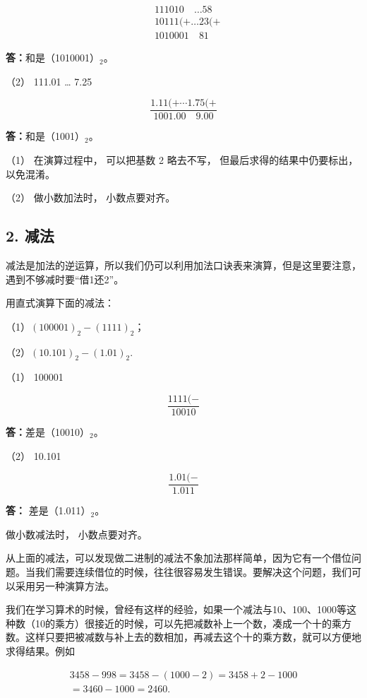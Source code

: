 \[
\begin{array}{rl} & 111010 \quad \dots 58 \\ & 10111 (+ \dots 23 (+ \\ \hline {} & 1010001 \quad 81 \end{array}
\]

\textbf{答：}和是（1010001）\(_{2}\)。

（2） 111.01 \ldots{} 7.25

\[
\frac{1.11 (+ \cdots 1.75 (+}{1001.00 \quad 9.00}
\]

\textbf{答：}和是（1001）\(_{2}\)。

 （1） 在演算过程中， 可以把基数 2 略去不写，
但最后求得的结果中仍要标出， 以免混淆。

（2） 做小数加法时， 小数点要对齐。

\subsection{2. 减法}

减法是加法的逆运算，所以我们仍可以利用加法口诀表来演算，但是这里要注意，遇到不够减时要``借1还2''。

 用直式演算下面的减法：

（1）\((100001)_2 - (1111)_2\)；

（2）\((10.101)_2 - (1.01)_2.\)

 （1） 100001

\[
\frac{1111 (-}{10010}
\]

\textbf{答：}差是（10010）\(_{2}\)。

（2） 10.101

\[
\frac{1.01 (-}{1.011}
\]

\textbf{答：} 差是（1.011）\(_{2}\)。

 做小数减法时， 小数点要对齐。

从上面的减法，可以发现做二进制的减法不象加法那样简单，因为它有一个借位问题。当我们需要连续借位的时候，往往很容易发生错误。要解决这个问题，我们可以采用另一种演算方法。

我们在学习算术的时候，曾经有这样的经验，如果一个减法与10、100、1000等这种数（10的乘方）很接近的时候，可以先把减数补上一个数，凑成一个十的乘方数。这样只要把被减数与补上去的数相加，再减去这个十的乘方数，就可以方便地求得结果。例如

\[
\begin{array}{l} 3458 - 998 = 3458 - (1000 - 2) = 3458 + 2 - 1000 \\ = 3460 - 1000 = 2460. \\ \end{array}
\]

